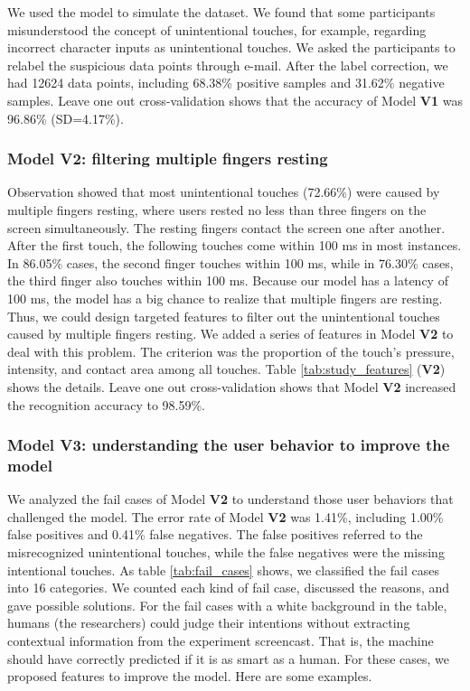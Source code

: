 We used the model to simulate the dataset. We found that some participants misunderstood the concept of unintentional touches, for example, regarding incorrect character inputs as unintentional touches. We asked the participants to relabel the suspicious data points through e-mail. After the label correction, we had 12624 data points, including 68.38\% positive samples and 31.62\% negative samples. Leave one out cross-validation shows that the accuracy of Model \textbf{V1} was 96.86\% (SD=4.17\%). 


\subsubsection{Model V2: filtering multiple fingers resting}

Observation showed that most unintentional touches (72.66\%) were caused by multiple fingers resting, where users rested no less than three fingers on the screen simultaneously. The resting fingers contact the screen one after another. After the first touch, the following touches come within 100 ms in most instances. In 86.05\% cases, the second finger touches within 100 ms, while in 76.30\% cases, the third finger also touches within 100 ms. Because our model has a latency of 100 ms, the model has a big chance to realize that multiple fingers are resting. Thus, we could design targeted features to filter out the unintentional touches caused by multiple fingers resting.
We added a series of features in Model \textbf{V2} to deal with this problem. The criterion was the proportion of the touch's pressure, intensity, and contact area among all touches. Table \ref{tab:study_features} (\textbf{V2}) shows the details. Leave one out cross-validation shows that Model \textbf{V2} increased the recognition accuracy to 98.59\%.

\subsubsection{Model V3: understanding the user behavior to  improve the model}

We analyzed the fail cases of Model \textbf{V2} to understand those user behaviors that challenged the model. The error rate of Model \textbf{V2} was 1.41\%, including 1.00\% false positives and 0.41\% false negatives. The false positives referred to the misrecognized unintentional touches, while the false negatives were the missing intentional touches. As table \ref{tab:fail_cases} shows, we classified the fail cases into 16 categories. We counted each kind of fail case, discussed the reasons, and gave possible solutions. For the fail cases with a white background in the table, humans (the researchers) could judge their intentions without extracting contextual information from the experiment screencast. That is, the machine should have correctly predicted if it is as smart as a human. For these cases, we proposed features to improve the model. Here are some examples.

